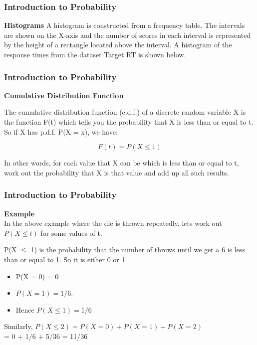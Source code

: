 \documentclass[IntroMain.tex]{subfiles}
\begin{document}
\begin{frame}
	\frametitle{Introduction to Probability}
	\Large
	\textbf{Histograms}
	A histogram is constructed from a frequency table. The intervals are shown on the X-axis and the number of scores in each interval is represented by the height of a rectangle located above the interval. A histogram of the response times from the dataset Target RT is shown below.
	
\end{frame}
\begin{frame}
	\frametitle{Introduction to Probability}
	\Large
	
	\textbf{Cumulative Distribution Function}
	
	The cumulative distribution function (c.d.f.) of a discrete random variable X is the function F(t) which tells you the probability that X is less than or equal to t. So if X has p.d.f. P(X = x), we have:
	
	\[F(t) = P(X \leq 1)\] %
	
	In other words, for each value that X can be which is less than or equal to t, work out the probability that X is that value and add up all such results.
	
\end{frame}
\begin{frame}
	\frametitle{Introduction to Probability}
	\Large
	
	\textbf{Example}\\
	
	In the above example where the die is thrown repeatedly, lets work out $P(X \leq t)$ for some values of t.
	
	P(X $\leq$ 1) is the probability that the number of throws until we get a 6 is less than or equal to 1. So it is either 0 or 1. 
	
	\begin{itemize}
		\item P(X = 0) = 0 
		\item $P(X = 1) = 1/6$.
		\item  Hence $P(X \leq 1) = 1/6$
	\end{itemize}
	
	Similarly, $P(X \leq 2) = P(X = 0) + P(X = 1) + P(X = 2)$\\ = 0 + 1/6 + 5/36 = 11/36
	
\end{frame}
\end{document}
